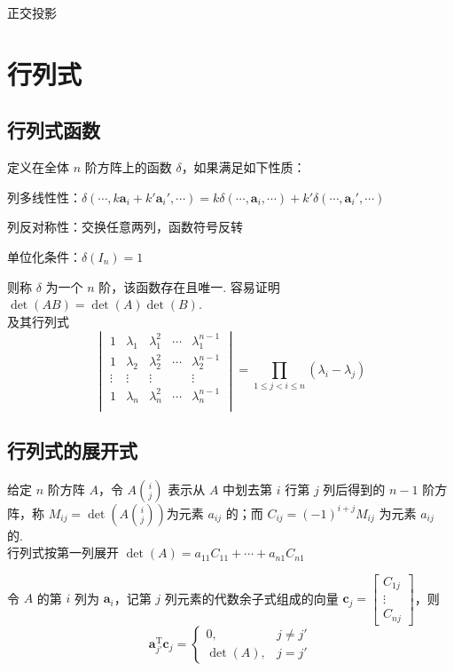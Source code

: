\documentclass[./main.tex]{subfiles}
\begin{document}
正交投影

\section{行列式}
\subsection{行列式函数}
定义在全体 $n$ 阶方阵上的函数 $\delta$，如果满足如下性质：
\begin{enumerate*}
    \item 列多线性性：$\delta(\cdots,k\bm{a}_i+k'\bm{a}_i',\cdots)=k\delta(\cdots,\bm{a}_i,\cdots)+k'\delta(\cdots,\bm{a}_i',\cdots)$
    \item 列反对称性：交换任意两列，函数符号反转
    \item 单位化条件：$\delta(I_n)=1$
\end{enumerate*}
则称 $\delta$ 为一个 $n$ 阶，该函数存在且唯一. 容易证明 $\det(AB)=\det(A)\det(B)$. \\

及其行列式
\begin{equation}
    \begin{vmatrix}
        1      & \lambda_1 & \lambda_1^2 & \cdots & \lambda_1^{n-1} \\
        1      & \lambda_2 & \lambda_2^2 & \cdots & \lambda_2^{n-1} \\
        \vdots & \vdots    & \vdots      &        & \vdots          \\
        1      & \lambda_n & \lambda_n^2 & \cdots & \lambda_n^{n-1} \\
    \end{vmatrix}=\prod_{1\le j<i\le n}(\lambda_i-\lambda_j)
\end{equation}

\subsection{行列式的展开式}
给定 $n$ 阶方阵 $A$，令 $A\binom{i}{j}$ 表示从 $A$ 中划去第 $i$ 行第 $j$ 列后得到的 $n-1$ 阶方阵，称 $M_{ij}=\det\left(A\binom{i}{j}\right)$为元素 $a_{ij}$ 的；而 $C_{ij}=(-1)^{i+j}M_{ij}$ 为元素 $a_{ij}$ 的. \\

行列式按第一列展开 $\det(A)=a_{11}C_{11}+\cdots+a_{n1}C_{n1}$

令 $A$ 的第 $i$ 列为 $\bm{a}_i$，记第 $j$ 列元素的代数余子式组成的向量 $\bm{c}_j=\begin{bmatrix}
        C_{1j} \\\vdots\\C_{nj}
    \end{bmatrix}$，则
\begin{equation}
    \bm{a}_{j'}^{\mathrm{T}}\bm{c}_j=\begin{cases}
        0,       & j\neq j' \\
        \det(A), & j=j'
    \end{cases}
\end{equation}
\end{document}
